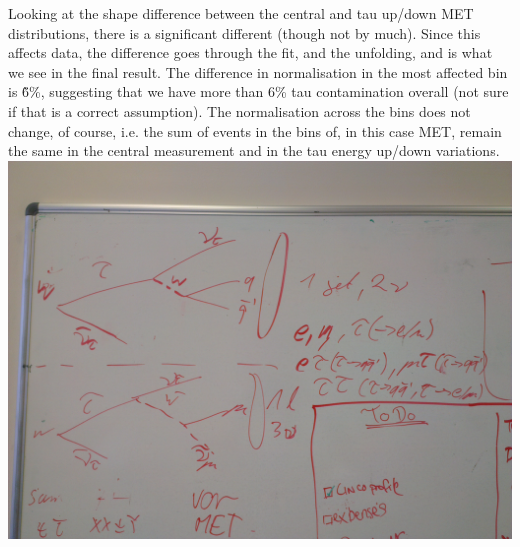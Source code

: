 Looking at the shape difference between the central and tau up/down MET distributions, there is a significant
different (though not by much). Since this affects data, the difference goes through the fit, and the
unfolding, and is what we see in the final result. The difference in normalisation in the most affected bin is
\~6\%, suggesting that we have more than 6\% tau contamination overall (not sure if that is a correct
assumption). The normalisation across the bins does not change, of course, i.e. the sum of events in the bins
of, in this case MET, remain the same in the central measurement and in the tau energy up/down variations.
\includegraphics[width=\textwidth]{Chapters/04_Analysis/04b_XSections/Images/IMG_20150219_160840.jpg}
		